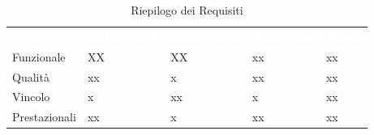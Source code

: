 \begin{table}[!htbp]
\renewcommand{\arraystretch}{1.5}
\begin{tabular}{ m{}<{\centering}  m{}<{\centering}  m{}<{\centering}  m{}<{\centering}  m{}<{\centering} }
	\rowcolor{darkblue}
	\textcolor{white}{\textbf{Tipologia}} &\textcolor{white}{\textbf{Obbligatorio}}& \textcolor{white}{\textbf{Desiderabile}} & \textcolor{white}{\textbf{Facoltativo}}&\textcolor{white}{\textbf{Totale}}\\ 
	Funzionale & XX & XX & xx & xx\\	
	\rowcolor{gray!10} Qualità & xx & x & xx & xx\\	
	Vincolo & x & xx & x & xx\\	
	\rowcolor{gray!10} Prestazionali & xx & x & xx & xx\\	
\end{tabular}
\caption{Riepilogo dei Requisiti}
\end{table}